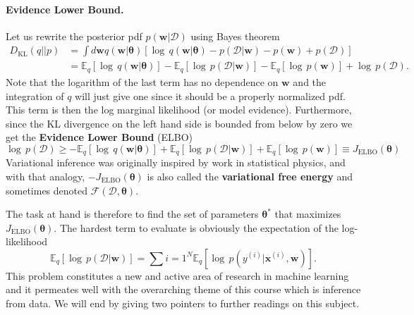 \documentclass[%
oneside,                 %
final,                   %
10pt]{article}
\begin{document}
\paragraph{Evidence Lower Bound.}
Let us rewrite the posterior pdf $p(\boldsymbol{w} \lvert \mathcal{D})$ using Bayes theorem
\begin{align*}
D_\mathrm{KL}(q||p) &= \int d \boldsymbol{w} q(\boldsymbol{w}\lvert \boldsymbol{\theta}) \left[ \log \, q(\boldsymbol{w}\lvert \boldsymbol{\theta})  - p( \mathcal{D} \lvert \boldsymbol{w}) - p(\boldsymbol{w}) + p(\mathcal{D}) \right] \\
&= \mathbb{E}_{q} \left[ \log \, q(\boldsymbol{w} \lvert \boldsymbol{\theta}) \right]
- \mathbb{E}_{q} \left[ \log \, p(\mathcal{D} \lvert \boldsymbol{w}) \right]
- \mathbb{E}_{q} \left[ \log \, p(\boldsymbol{w}) \right]
+ \log \, p(\mathcal{D}).
\end{align*}
Note that the logarithm of the last term has no dependence on $\boldsymbol{w}$ and the integration of $q$ will just give one since it should be a properly normalized pdf. This term is then the log marginal likelihood (or model evidence). Furthermore, since the KL divergence on the left hand side is bounded from below by zero we get the \textbf{Evidence Lower Bound} (ELBO)
\begin{equation}
\log \, p(\mathcal{D}) \ge 
- \mathbb{E}_{q} \left[ \log \, q(\boldsymbol{w} \lvert \boldsymbol{\theta}) \right]
+ \mathbb{E}_{q} \left[ \log \, p(\mathcal{D} \lvert \boldsymbol{w}) \right]
+ \mathbb{E}_{q} \left[ \log \, p(\boldsymbol{w}) \right]
\equiv J_\mathrm{ELBO}(\boldsymbol{\theta})
\label{eq:elbo}
\end{equation}
Variational inference was originally inspired by work in statistical physics, and with that analogy, $-J_\mathrm{ELBO}(\boldsymbol{\theta})$ is also called the \textbf{variational free energy} and sometimes denoted $\mathcal{F}(\mathcal{D},\boldsymbol{\theta})$.

The task at hand is therefore to find the set of parameters $\boldsymbol{\theta}^*$ that maximizes $J_\mathrm{ELBO}(\boldsymbol{\theta})$. The hardest term to evaluate is obviously the expectation of the log-likelihood
\[
\mathbb{E}_{q} \left[ \log \, p(\mathcal{D} \lvert \boldsymbol{w}) \right]
= \sum{i=1}^N \mathbb{E}_{q} \left[ \log \, p( y^{(i)} \lvert \boldsymbol{x}^{(i)}, \boldsymbol{w}) \right].
\]
This problem constitutes a new and active area of research in machine learning and it permeates well with the overarching theme of this course which is inference from data. We will end by giving two pointers to further readings on this subject.
\end{document}
